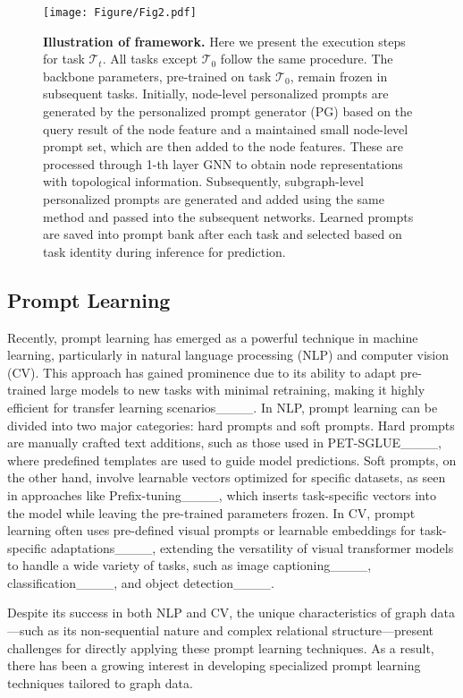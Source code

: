 \begin{figure*}[t]
	\centering
	\texttt{[image: Figure/Fig2.pdf]}
	\caption{\textbf{Illustration of \ourmethod framework.} Here we present the execution steps for task $\mathcal{T}_t$. All tasks except $\mathcal{T}_0$ follow the same procedure. The backbone parameters, pre-trained on task $\mathcal{T}_0$, remain frozen in subsequent tasks. Initially, node-level personalized prompts are generated by the personalized prompt generator (PG) based on the query result of the node feature and a maintained small node-level prompt set, which are then added to the node features. These are processed through 1-th layer GNN to obtain node representations with topological information. Subsequently, subgraph-level personalized prompts are generated and added using the same method and passed into the subsequent networks. Learned prompts are saved into prompt bank after each task and selected based on task identity during inference for prediction.}
	\label{fig2}
\end{figure*}

\subsection{Prompt Learning}

Recently, prompt learning has emerged as a powerful technique in machine learning, particularly in natural language processing (NLP) and computer vision (CV). This approach has gained prominence due to its ability to adapt pre-trained large models to new tasks with minimal retraining, making it highly efficient for transfer learning scenarios____. In NLP, prompt learning can be divided into two major categories: hard prompts and soft prompts. Hard prompts are manually crafted text additions, such as those used in PET-SGLUE____, where predefined templates are used to guide model predictions. Soft prompts, on the other hand, involve learnable vectors optimized for specific datasets, as seen in approaches like Prefix-tuning____, which inserts task-specific vectors into the model while leaving the pre-trained parameters frozen. In CV, prompt learning often uses pre-defined visual prompts or learnable embeddings for task-specific adaptations____, extending the versatility of visual transformer models to handle a wide variety of tasks, such as image captioning____, classification____, and object detection____.

Despite its success in both NLP and CV, the unique characteristics of graph data—such as its non-sequential nature and complex relational structure—present challenges for directly applying these prompt learning techniques. As a result, there has been a growing interest in developing specialized prompt learning techniques tailored to graph data.

